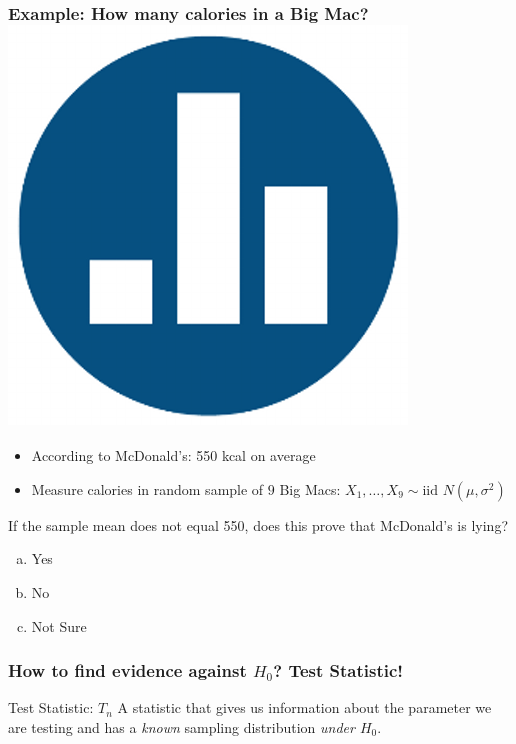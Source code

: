 \begin{frame}[t]
	\frametitle{Example: How many calories in a Big Mac? \hfill \includegraphics[scale = 0.05]{./images/clicker}}
\begin{itemize}
	\item According to McDonald's: 550 kcal on average
	\item Measure calories in random sample of $9$ Big Macs: $X_1, \hdots, X_{9} \sim \mbox{iid } N(\mu, \sigma^2)$
\end{itemize}

\vspace{1em}

\alert{If the sample mean does not equal 550, does this prove that McDonald's is lying?}
\begin{enumerate}[(a)]
	\item Yes
	\item No
	\item Not Sure
\end{enumerate}
\end{frame}
\begin{frame}
	\frametitle{How to find evidence against $H_0$? Test Statistic!}
	\begin{block}
		{Test Statistic: $T_n$}
		A statistic that gives us information about the parameter we are testing and has a \emph{known} sampling distribution \emph{under $H_0$}.
	\end{block}
\end{frame}
